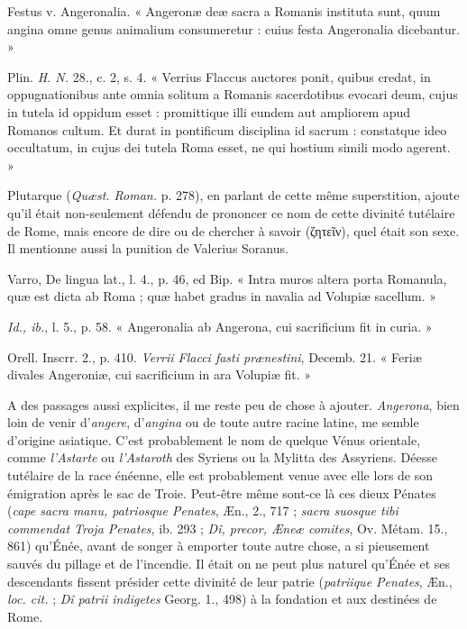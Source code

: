 \documentclass[a4paper, 11pt, oneside, polutonikogreek, french]{article}
\begin{document}
Festus v. Angeronalia. « Angeronæ deæ sacra a Romanis instituta sunt, quum angina omne genus animalium consumeretur : cuius festa Angeronalia dicebantur. »

Plin. \emph{H. N.} 28., c. 2, s. 4. « Verrius Flaccus auctores ponit, quibus credat, in oppugnationibus ante omnia solitum a Romanis sacerdotibus evocari deum, cujus in tutela id oppidum esset : promittique illi eundem aut ampliorem apud Romanos cultum. Et durat in pontificum disciplina id sacrum : constatque ideo occultatum, in cujus dei tutela Roma esset, ne qui hostium simili modo agerent. »

Plutarque (\emph{Quæst. Roman.} p. 278), en parlant de cette même superstition, ajoute qu'il était non-seulement défendu de prononcer ce nom de cette divinité tutélaire de Rome, mais encore de dire ou de chercher à savoir (ζητεῖν), quel était son sexe. Il mentionne aussi la punition de Valerius Soranus.

Varro, De lingua lat., l. 4., p. 46, ed Bip. « Intra muros altera porta Romanula, quæ est dicta ab Roma ; quæ habet gradus in navalia ad Volupiæ sacellum. »

\emph{Id., ib.}, l. 5., p. 58. « Angeronalia ab Angerona, cui sacrificium fit in curia. »

Orell. Inscrr. 2., p. 410. \emph{Verrii Flacci fasti prænestini}, Decemb. 21. « Feriæ divales Angeroniæ, cui sacrificium in ara Volupiæ fit. »

A des passages aussi explicites, il me reste peu de chose à ajouter. \emph{Angerona}, bien loin de venir d'\emph{angere}, d'\emph{angina} ou de toute autre racine latine, me semble d'origine asiatique. C'est probablement le nom de quelque Vénus orientale, comme \emph{l'Astarte} ou \emph{l'Astaroth} des Syriens ou la Mylitta des Assyriens. Déesse tutélaire de la race énéenne, elle est probablement venue avec elle lors de son émigration après le sac de Troie. Peut-être même sont-ce là ces dieux Pénates (\emph{cape sacra manu, patriosque Penates}, Æn., 2., 717 ; \emph{sacra suosque tibi commendat Troja Penates}, ib. 293 ; \emph{Dî, precor, Æneæ comites}, Ov. Métam. 15., 861) qu'Énée, avant de songer à emporter toute autre chose, a si pieusement sauvés du pillage et de l'incendie. Il était on ne peut plus naturel qu'Énée et ses descendants fissent présider cette divinité de leur patrie (\emph{patriique Penates}, Æn., \emph{loc. cit.} ; \emph{Dî patrii indigetes} Georg. 1., 498) à la fondation et aux destinées de Rome.
\end{document}
